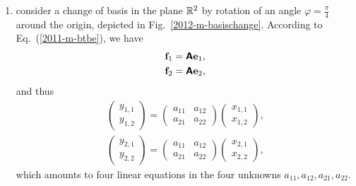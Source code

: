 {\begin{enumerate}
\item
 consider
a change of basis in the plane ${\Bbb R}^2$ by rotation of an angle $\varphi = \frac{\pi}{4}$ around the origin,
depicted in Fig.~\ref{2012-m-basischange}.
According to Eq.~(\ref{2011-m-btbe}),
we have
\begin{equation}
\begin{split}
{\bf f}_1=   \textsf{\textbf{A}}{\bf e}_1,\\
{\bf f}_2=   \textsf{\textbf{A}}{\bf e}_2
,
\end{split}
\end{equation}
and thus
\begin{equation}
\begin{split}
\begin{pmatrix}
y_{1,1}\\
y_{1,2}
\end{pmatrix}
=
\begin{pmatrix}
a_{11}&a_{12}\\
a_{21}&a_{22}
\end{pmatrix}
\begin{pmatrix}
x_{1,1}\\
x_{1,2}
\end{pmatrix}
,\\
\begin{pmatrix}
y_{2,1}\\
y_{2,2}
\end{pmatrix}
=
\begin{pmatrix}
a_{11}&a_{12}\\
a_{21}&a_{22}
\end{pmatrix}
\begin{pmatrix}
x_{2,1}\\
x_{2,2}
\end{pmatrix}
,
\end{split}
\end{equation}
which amounts to four linear equations in the four unknowns $a_{11}, a_{12},
a_{21}, a_{22}$.
\begin{marginfigure}%
\unitlength 0.3mm %
\linethickness{0.4pt}
\ifx\plotpoint\undefined\newsavebox{\plotpoint}\fi %

\end{marginfigure}
\end{enumerate}}
